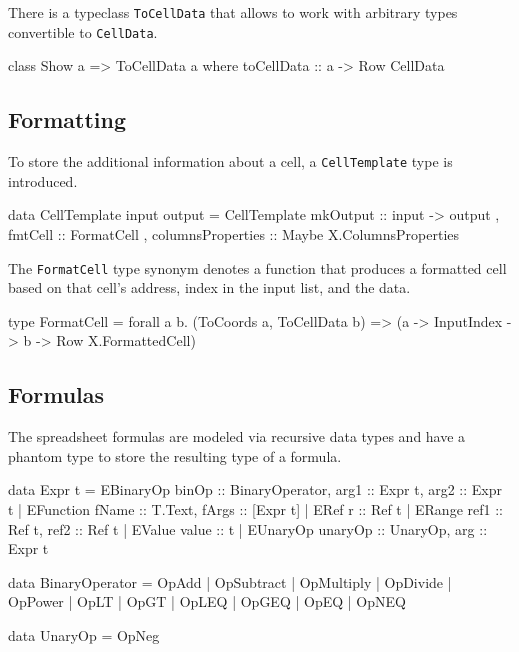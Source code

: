 There is a typeclass \texttt{ToCellData} that allows to work with arbitrary types convertible to \texttt{CellData}.

\begin{mycode}
class Show a => ToCellData a where
  toCellData :: a -> Row CellData
\end{mycode}

\subsection{Formatting}
\label{sec:formatting}

To store the additional information about a cell, a \texttt{CellTemplate} type is introduced.

\begin{mycode}
data CellTemplate input output = CellTemplate
  { mkOutput :: input -> output
  , fmtCell :: FormatCell
  , columnsProperties :: Maybe X.ColumnsProperties
  }
\end{mycode}

The \texttt{FormatCell} type synonym denotes a function that produces a formatted cell based on that cell's address, index in the input list, and the data.

\begin{mycode}
type FormatCell =
  forall a b.
  (ToCoords a, ToCellData b) =>
  (a -> InputIndex -> b -> Row X.FormattedCell)
\end{mycode}

\subsection{Formulas}
\label{sec:formulas}

The spreadsheet formulas are modeled via recursive data types and have a phantom type to store the resulting type of a formula.

\begin{mycode}
data Expr t
  = EBinaryOp {binOp :: BinaryOperator, arg1 :: Expr t, arg2 :: Expr t}
  | EFunction {fName :: T.Text, fArgs :: [Expr t]}
  | ERef {r :: Ref t}
  | ERange {ref1 :: Ref t, ref2 :: Ref t}
  | EValue {value :: t}
  | EUnaryOp {unaryOp :: UnaryOp, arg :: Expr t}

data BinaryOperator
  = OpAdd
  | OpSubtract
  | OpMultiply
  | OpDivide
  | OpPower
  | OpLT
  | OpGT
  | OpLEQ
  | OpGEQ
  | OpEQ
  | OpNEQ

data UnaryOp
  = OpNeg
\end{mycode}

